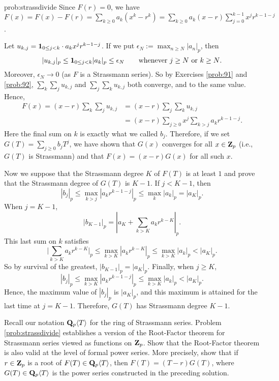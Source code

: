 \begin{sol}{prob:strassdivide} Since $F(r)=0$, we have  $F(x) = F(x) - F(r) = \sum_{k\ge 0} a_k (x^k -r^k) =\sum_{k\ge 0} a_k (x-r) \sum_{j=0}^{k-1}x^j r^{k-1-j}$. 

Let $u_{k,j} = \mathbf{1}_{0\le j < k} \cdot a_k x^{j} r^{k-1-j}$. If we put $\epsilon_N:= \max_{n\ge N} |a_n|_p$, then 
\[ |u_{k,j}|_p \le \mathbf{1}_{0 \le j < k} |a_k|_p \le \epsilon_N\qquad\text{whenever $j\ge N$ or $k\ge N$}. \] Moreover, $\epsilon_N\to 0$ (as $F$ is a Strassmann series). So by Exercises \ref{prob:91} and \ref{prob:92}, $\sum_{k}\sum_{j} u_{k,j}$ and $\sum_{j}\sum_{k} u_{k,j}$ both converge, and to the same value. Hence,
\begin{align*} F(x)  = (x-r) \sum_{k} \sum_{j} u_{k,j} &=(x-r) \sum_{j} \sum_{k} u_{k,j}\\
&= (x-r) \sum_{j\ge 0}x^j\sum_{k > j}a_k r^{k-1-j}.
\end{align*}
Here the final sum on $k$ is exactly what we called $b_j$. Therefore, if we set $G(T) = \sum_{j\ge 0} b_j T^j$, we have shown that $G(x)$ converges for all $x\in\mathbf{Z}_p$ (i.e., $G(T)$ is Strassmann) and that $F(x) = (x-r) G(x)$ for all such $x$.

Now we suppose that the Strassmann degree $K$ of $F(T)$ is at least $1$ and prove that the Strassmann degree of $G(T)$ is $K-1$. If $j < K-1$, then
\[ |b_j|_p \le \max_{k > j} |a_k r^{k-1-j}|_p \le \max_{k} |a_k|_p = |a_K|_p. \]
When $j=K-1$,
\[ |b_{K-1}|_p = \left|a_K + \sum_{k>K} a_k r^{k-K}\right|_p.\]
This last sum on $k$ satisfies $$\bigg|\sum_{k > K} a_k r^{k-K}\bigg|_p \le \max_{k > K} |a_k r^{k-K}|_p \le \max_{k > K} |a_k|_{p} < |a_K|_p.$$ So by survival of the greatest, $|b_{K-1}|_p = |a_K|_p$. Finally, when $j \ge K$,
\[ |b_j|_p \le \max_{k>K} |a_k r^{k-1-j}|_p \le \max_{k > K} |a_k|_p < |a_K|_p. \]
Hence, the maximum value of $|b_j|_p$ is $|a_K|_{p}$, and this maximum is attained for the last time at $j=K-1$. Therefore, $G(T)$ has  Strassmann degree $K-1$.
\end{sol}

\begin{challenge} Recall our notation $\mathbf{Q}_p\langle T\rangle$ for the ring of Strassmann series.  Problem \ref{prob:strassdivide} establishes a version of the Root-Factor theorem for Strassmann series viewed as functions on $\mathbf{Z}_p$. Show that the Root-Factor theorem is also valid at the level of formal power series. More precisely,  show that if $r \in \mathbf{Z}_p$ is a root of $F(T) \in \mathbf{Q}_p\langle T\rangle$, then $F(T) = (T-r) G(T)$, where $G(T) \in \mathbf{Q}_p\langle T\rangle$ is the power series constructed in the preceding solution. 
\end{challenge}

